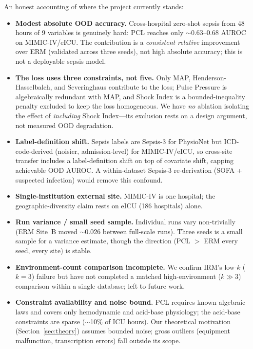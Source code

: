 \documentclass{article}
\begin{document}
An honest accounting of where the project currently stands:
\begin{itemize}
\item \textbf{Modest absolute OOD accuracy.} Cross-hospital zero-shot sepsis from 48 hours of 9 variables is genuinely hard: PCL reaches only $\sim$0.63--0.68 AUROC on MIMIC-IV/eICU. The contribution is a \emph{consistent relative} improvement over ERM (validated across three seeds), not high absolute accuracy; this is not a deployable sepsis model.
\item \textbf{The loss uses three constraints, not five.} Only MAP, Henderson-Hasselbalch, and Severinghaus contribute to the loss; Pulse Pressure is algebraically redundant with MAP, and Shock Index is a bounded-inequality penalty excluded to keep the loss homogeneous. We have \emph{no} ablation isolating the effect of \emph{including} Shock Index---its exclusion rests on a design argument, not measured OOD degradation.
\item \textbf{Label-definition shift.} Sepsis labels are Sepsis-3 for PhysioNet but ICD-code-derived (noisier, admission-level) for MIMIC-IV/eICU, so cross-site transfer includes a label-definition shift on top of covariate shift, capping achievable OOD AUROC. A within-dataset Sepsis-3 re-derivation (SOFA + suspected infection) would remove this confound.
\item \textbf{Single-institution external site.} MIMIC-IV is one hospital; the geographic-diversity claim rests on eICU (186 hospitals) alone.
\item \textbf{Run variance / small seed sample.} Individual runs vary non-trivially (ERM Site~B moved $\sim$0.026 between full-scale runs). Three seeds is a small sample for a variance estimate, though the direction (PCL $>$ ERM every seed, every site) is stable.
\item \textbf{Environment-count comparison incomplete.} We confirm IRM's low-$k$ ($k{=}3$) failure but have not completed a matched high-environment ($k \gg 3$) comparison within a single database; left to future work.
\item \textbf{Constraint availability and noise bound.} PCL requires known algebraic laws and covers only hemodynamic and acid-base physiology; the acid-base constraints are sparse ($\sim$10\% of ICU hours). Our theoretical motivation (Section~\ref{sec:theory}) assumes bounded noise; gross outliers (equipment malfunction, transcription errors) fall outside its scope.
\end{itemize}
\end{document}
